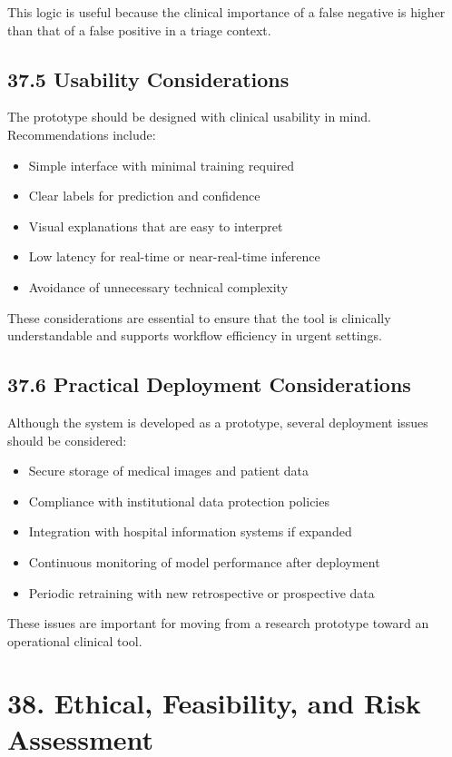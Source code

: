 \documentclass[12pt,a4paper]{report}
\begin{document}
This logic is useful because the clinical importance of a false negative is higher than that of a false positive in a triage context.

\subsection{37.5 Usability Considerations}

The prototype should be designed with clinical usability in mind. Recommendations include:

\begin{itemize}
\item Simple interface with minimal training required
\item Clear labels for prediction and confidence
\item Visual explanations that are easy to interpret
\item Low latency for real-time or near-real-time inference
\item Avoidance of unnecessary technical complexity
\end{itemize}

These considerations are essential to ensure that the tool is clinically understandable and supports workflow efficiency in urgent settings.

\subsection{37.6 Practical Deployment Considerations}

Although the system is developed as a prototype, several deployment issues should be considered:

\begin{itemize}
\item Secure storage of medical images and patient data
\item Compliance with institutional data protection policies
\item Integration with hospital information systems if expanded
\item Continuous monitoring of model performance after deployment
\item Periodic retraining with new retrospective or prospective data
\end{itemize}

These issues are important for moving from a research prototype toward an operational clinical tool.


\section{38. Ethical, Feasibility, and Risk Assessment}
\end{document}
